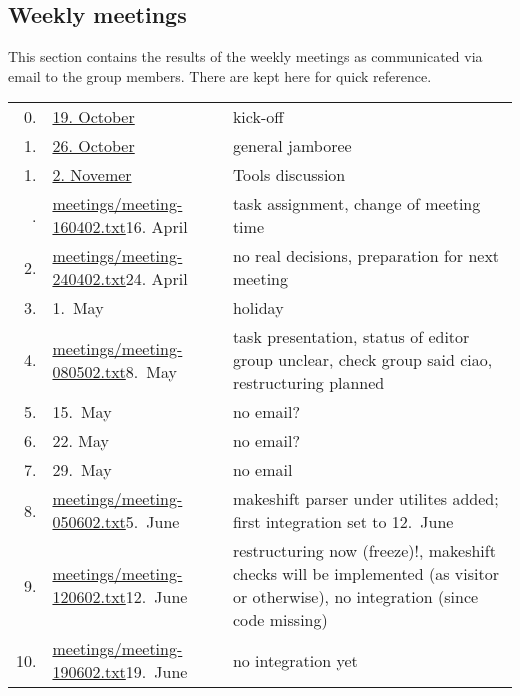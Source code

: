 
\subsection*{Weekly meetings}
\label{sec:meetings}


This section contains the results of the weekly meetings as communicated
via email to the group members. There are kept here for quick reference.




  \begin{table}[htbp]
    \centering
    \begin{tabular}[t]{r@{\quad}l@{\quad\quad}p{9cm}}
    \\\hline
    0.
    &
    \href{meetings/2004-10-19.txt}{19. October}
    &
    kick-off
    \\
    1.
    &
    \href{meetings/2004-10-26.txt}{26. October}
    &
    general jamboree
    \\
    1.
    &
    \href{meetings/2004-11-02.txt}{2. Novemer}
    &
    Tools discussion
    \\\hline
\iffalse
    1.
    &
    \url{meetings/meeting-160402.txt}{16. April}
    &
    task assignment, change of meeting time
    \\
    2.
    & 
    \url{meetings/meeting-240402.txt}{24. April}
    &
    no real decisions, preparation for next meeting
    \\
    3.
    &
    1.\ May
    &
    holiday
    \\
    4.
    &
    \url{meetings/meeting-080502.txt}{8.\ May}
    & 
    task presentation, status of editor group unclear,
    check group said ciao, restructuring planned
    \\
    5.
    &
    15.\ May
    &
    no email?
    \\
    6.
    &
    22. May
    &
    no email?
    \\
    7.
    &
    29.\ May
    &
    no email
    \\
    8.
    &
    \url{meetings/meeting-050602.txt}{5.\ June}
    &
    makeshift parser under utilites added; first
    integration set to 12.\ June
    \\
    9.
    &
    \url{meetings/meeting-120602.txt}{12.\ June}
    &
    restructuring now (freeze)!, makeshift checks will be implemented 
    (as visitor or otherwise), no integration (since code
    missing)
    \\
    10. 
    &
    \url{meetings/meeting-190602.txt}{19.\ June}
    &
    no integration yet
    \\

\end{tabular}
\end{table}
